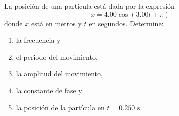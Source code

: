 \item La posición de una partícula está dada por la expresión
$$ x = 4.00 \cos (3.00t + \pi) $$
donde $x$ está en metros y $t$ en segundos. Determine:
\begin{enumerate}
    \item la frecuencia y
    \item el periodo del movimiento,
    \item la amplitud del movimiento,
    \item la constante de fase y
    \item la posición de la partícula en $t = 0.250\text{ s}$.
\end{enumerate}